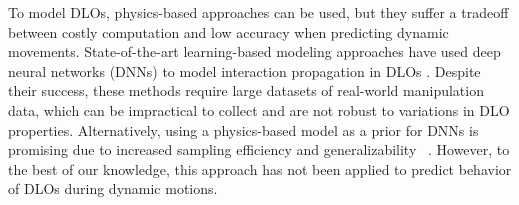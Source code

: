 

To model DLOs, physics-based approaches can be used, but they suffer a tradeoff between costly computation and low accuracy when predicting dynamic movements. 
State-of-the-art learning-based modeling approaches have used deep neural networks (DNNs) to model interaction propagation in DLOs \cite{GNN, bi-LSTM_baseline, inlstm}.
Despite their success, these methods require large datasets of real-world manipulation data, which can be impractical to collect and are not robust to variations in DLO properties.
Alternatively, using a physics-based model as a prior for DNNs is promising due to increased sampling efficiency and generalizability ~\cite{PINN, mlphysicsprocess, physicslearn1, physicslearn2, physicslearn3}. 
However, to the best of our knowledge, this approach has not been applied to predict behavior of DLOs during dynamic motions.


